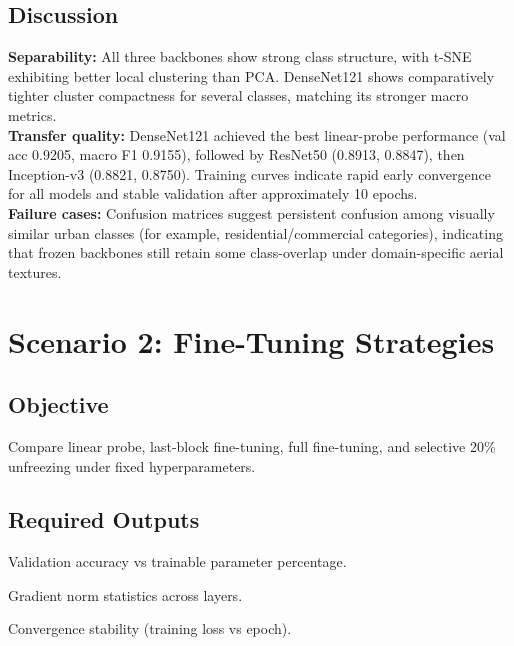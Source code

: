 \documentclass[11pt,a4paper]{report}
\renewenvironment{leftbar}[1][\hsize]
  {\def\FrameCommand{{\color{subsectionblue}\vrule width 3pt}\hspace{0pt}}%
   \MakeFramed{\hsize#1\advance\hsize-\width\FrameRestore}}
  {\endMakeFramed}
\renewenvironment{itemize}{\begin{leftbar}\begin{originalitemize}}{\end{originalitemize}\end{leftbar}}
\begin{document}
\section{Discussion}
\textbf{Separability:} All three backbones show strong class structure, with t-SNE exhibiting better local clustering than PCA. DenseNet121 shows comparatively tighter cluster compactness for several classes, matching its stronger macro metrics.\\
\textbf{Transfer quality:} DenseNet121 achieved the best linear-probe performance (val acc 0.9205, macro F1 0.9155), followed by ResNet50 (0.8913, 0.8847), then Inception-v3 (0.8821, 0.8750). Training curves indicate rapid early convergence for all models and stable validation after approximately 10 epochs.\\
\textbf{Failure cases:} Confusion matrices suggest persistent confusion among visually similar urban classes (for example, residential/commercial categories), indicating that frozen backbones still retain some class-overlap under domain-specific aerial textures.

\chapter{Scenario 2: Fine-Tuning Strategies}

\section{Objective}
Compare linear probe, last-block fine-tuning, full fine-tuning, and selective 20\% unfreezing under fixed hyperparameters.

\section{Required Outputs}
\begin{itemize}
  \item Validation accuracy vs trainable parameter percentage.
  \item Gradient norm statistics across layers.
  \item Convergence stability (training loss vs epoch).
\end{itemize}
\end{document}

